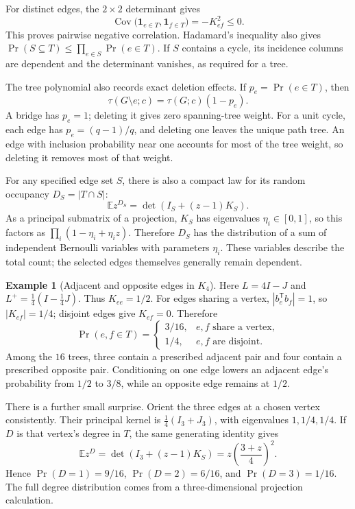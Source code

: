\documentclass[11pt]{article}
\theoremstyle{definition}
\newtheorem{example}[theorem]{Example}
\theoremstyle{remark}
\begin{document}
For distinct edges, the $2\times2$ determinant gives
\begin{equation}\label{eq:glin-negative-correlation}
 \operatorname{Cov}\bigl(\mathbf1_{e\in T},\mathbf1_{f\in T}\bigr)
 =-K_{ef}^2\le0.
\end{equation}
This proves pairwise negative correlation. Hadamard's inequality also gives $\Pr(S\subseteq T)\le\prod_{e\in S}\Pr(e\in T)$. If $S$ contains a cycle, its incidence columns are dependent and the determinant vanishes, as required for a tree.

The tree polynomial also records exact deletion effects. If $p_e=\Pr(e\in T)$, then
\[
 \tau(G\setminus e;c)=\tau(G;c)(1-p_e).
\]
A bridge has $p_e=1$; deleting it gives zero spanning-tree weight. For a unit cycle, each edge has $p_e=(q-1)/q$, and deleting one leaves the unique path tree. An edge with inclusion probability near one accounts for most of the tree weight, so deleting it removes most of that weight.

For any specified edge set $S$, there is also a compact law for its random occupancy $D_S=|T\cap S|$:
\[
 \mathbb E z^{D_S}=\det(I_S+(z-1)K_S).
\]
As a principal submatrix of a projection, $K_S$ has eigenvalues $\eta_i\in[0,1]$, so this factors as $\prod_i(1-\eta_i+\eta_i z)$. Therefore $D_S$ has the distribution of a sum of independent Bernoulli variables with parameters $\eta_i$. These variables describe the total count; the selected edges themselves generally remain dependent.

\begin{example}[Adjacent and opposite edges in $K_4$]\label{ex:glin-k4}
Here $L=4I-J$ and $L^+=\tfrac14(I-\tfrac14J)$. Thus $K_{ee}=1/2$. For edges sharing a vertex, $|b_e^{\mathsf T}b_f|=1$, so $|K_{ef}|=1/4$; disjoint edges give $K_{ef}=0$. Therefore
\[
 \Pr(e,f\in T)=
 \begin{cases}
 3/16,&e,f\text{ share a vertex},\\
 1/4,&e,f\text{ are disjoint}.
 \end{cases}
\]
Among the $16$ trees, three contain a prescribed adjacent pair and four contain a prescribed opposite pair. Conditioning on one edge lowers an adjacent edge's probability from $1/2$ to $3/8$, while an opposite edge remains at $1/2$.

There is a further small surprise. Orient the three edges at a chosen vertex consistently. Their principal kernel is $\tfrac14(I_3+J_3)$, with eigenvalues $1,1/4,1/4$. If $D$ is that vertex's degree in $T$, the same generating identity gives
\[
 \mathbb E z^D=\det(I_3+(z-1)K_S)
 =z\left(\frac{3+z}{4}\right)^2.
\]
Hence $\Pr(D=1)=9/16$, $\Pr(D=2)=6/16$, and $\Pr(D=3)=1/16$. The full degree distribution comes from a three-dimensional projection calculation.
\end{example}
\end{document}
